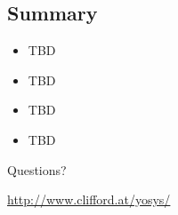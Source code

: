 
\subsection{Summary}

\begin{frame}{\subsecname}
\begin{itemize}
\item TBD
\item TBD
\item TBD
\item TBD
\end{itemize}

\bigskip
\bigskip
\begin{center}
Questions?
\end{center}

\bigskip
\bigskip
\begin{center}
\url{http://www.clifford.at/yosys/}
\end{center}
\end{frame}

